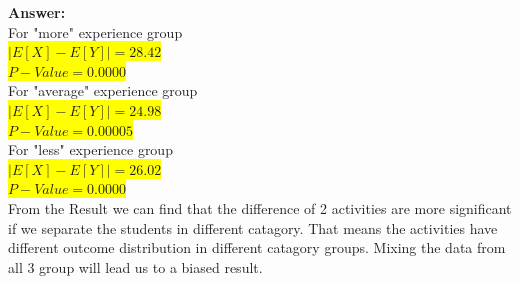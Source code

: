 \documentclass{article}
\newcommand{\myansw}{\textbf{Answer:}\\}
\begin{document}
\begin{enumerate}
\begin{enumerate}
		\myansw
		For "more" experience group\\
		\colorbox{yellow}{$|E[X]-E[Y]| = 28.42$}\\
		\colorbox{yellow}{$P-Value = 0.0000$}\\
		For "average" experience group\\
		\colorbox{yellow}{$|E[X]-E[Y]| = 24.98$}\\
		\colorbox{yellow}{$P-Value = 0.00005$}\\
		For "less" experience group\\
		\colorbox{yellow}{$|E[X]-E[Y]| = 26.02$}\\
		\colorbox{yellow}{$P-Value = 0.0000$}\\
		From the Result we can find that the difference of 2 activities are more significant if we separate the students in different catagory. That means the activities have different outcome distribution in different catagory groups. Mixing the data from all 3 group will lead us to a biased result.
	\end{enumerate}
	
	
\end{enumerate}


\newpage
\end{document}
